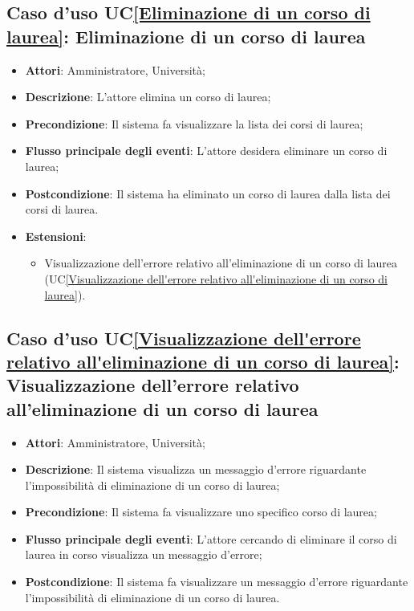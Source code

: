 \subsection{Caso d'uso UC\ref{Eliminazione di un corso di laurea}: Eliminazione di un corso di laurea}
\begin{itemize}
	\item \textbf{Attori}: Amministratore, Università;
	\item \textbf{Descrizione}: L'attore elimina un corso di laurea;
	
	\item \textbf{Precondizione}: Il sistema fa visualizzare la lista dei corsi di laurea;
	
	
	\item \textbf{Flusso principale degli eventi}: L'attore desidera eliminare un corso di laurea;
	
	\item \textbf{Postcondizione}: Il sistema ha eliminato un corso di laurea dalla lista dei corsi di laurea.
	
	
	\item \textbf{Estensioni}:
	\begin{itemize}
		\item Visualizzazione dell'errore relativo all'eliminazione di un corso di laurea (UC\ref{Visualizzazione dell'errore relativo all'eliminazione di un corso di laurea}).
	\end{itemize}
\end{itemize}

\subsection{Caso d'uso UC\ref{Visualizzazione dell'errore relativo all'eliminazione di un corso di laurea}: Visualizzazione dell'errore relativo all'eliminazione di un corso di laurea}
\begin{itemize}
	\item \textbf{Attori}: Amministratore, Università;
	\item \textbf{Descrizione}: Il sistema visualizza un messaggio d'errore riguardante l'impossibilità di eliminazione di un corso di laurea;
	
	\item \textbf{Precondizione}: Il sistema fa visualizzare uno specifico corso di laurea;
	
	
	\item \textbf{Flusso principale degli eventi}: L'attore cercando di eliminare il corso di laurea in corso visualizza un messaggio d'errore;
	
	\item \textbf{Postcondizione}: Il sistema fa visualizzare un messaggio d'errore riguardante l'impossibilità di eliminazione di un corso di laurea.
	
\end{itemize}


